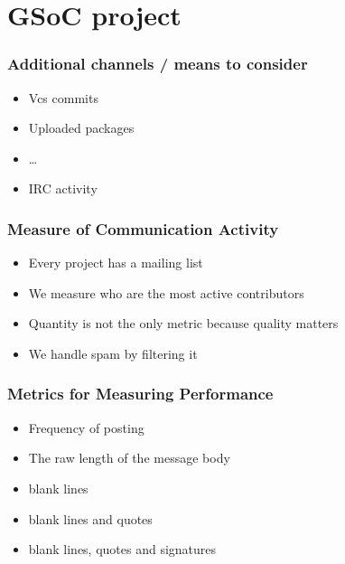 \documentclass[compress]{beamer}
\begin{document}
\section{GSoC project}

\begin{frame}
  \frametitle{Additional channels / means %
              to consider
             }
  \begin{itemize}
    \item Vcs commits
    \item Uploaded packages
    \item \dots
    \item IRC activity %
  \end{itemize}
\end{frame}

\begin{frame}
  \frametitle{Measure of Communication Activity}

  \begin{itemize}
     \item Every project has a mailing list
     \item We measure who are the most active contributors
     \item Quantity is not the only metric because quality matters 
     \item We handle spam by filtering it
  \end{itemize}

\end{frame}

\begin{frame}
 \frametitle{Metrics for Measuring Performance}

 \begin{itemize}
    \item Frequency of posting 
    \item The raw length of the message body 
    \item blank lines 
    \item blank lines and quotes
    \item blank lines, quotes and signatures
 \end{itemize}
\end{frame}
\end{document}
